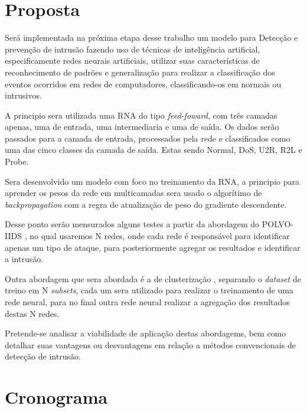 \documentclass[
	12pt,				%
	openright,			%
	oneside,
	a4paper,			%
	english,			%
	french,				%
	spanish,			%
	brazil				%
	]{abntex2}
\begin{document}
\chapter[Proposta]{Proposta}

Será implementada na próxima etapa desse trabalho um modelo para Detecção e prevenção de intrusão fazendo uso de técnicas de inteligência artificial, especificamente redes neurais artificiais, utilizar suas características de reconhecimento de padrões e generalização para realizar a classificação dos eventos ocorridos em redes de computadores, classificando-os em normais ou intrusivos.

A principio sera utilizada uma RNA do tipo \textit{feed-foward}, com três camadas apenas, uma de entrada, uma intermediaria e uma de saída. Os dados serão passados para a camada de entrada, processados pela rede e classificados como uma das cinco classes da camada de saída. Estas sendo Normal, DoS, U2R, R2L e Probe.  

Sera desenvolvido um modelo com foco no treinamento da RNA, a principio para aprender os pesos da rede em multicamadas sera usado o algorítimo de \textit{backpropagation} com a regra de atualização de peso do gradiente descendente.

Desse ponto serão mensurados alguns testes a partir da abordagem do POLVO-IIDS \cite{polvo1}, no qual usaremos N redes, onde cada rede é responsável para identificar apenas um tipo de ataque, para posteriormente agregar os resultados e identificar a intrusão.

Outra abordagem que sera abordada é a de clusterização \cite{Surana}, separando o \textit{dataset} de treino em N \textit{subsets}, cada um sera utilizado para realizar o treinamento de uma rede neural, para no final outra rede neural realizar a agregação dos resultados destas N redes.

 
Pretende-se analisar a viabilidade de aplicação destas abordagems, bem como
detalhar suas vantagens ou desvantagens em relação a métodos convencionais de
detecção de intrusão.


\chapter[Cronograma]{Cronograma}



\postextual




\end{document}
